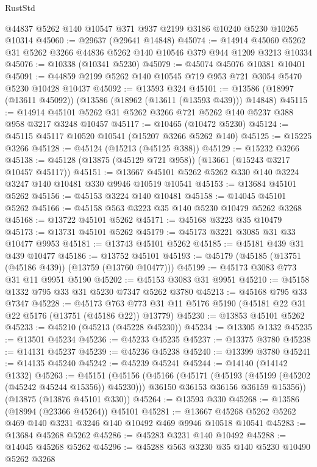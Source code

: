 \begin{lexlean}{RustStd}
\begin{coremodule}
    @44837
    @5262
    @140
    @10547
    @371
    @937
    @2199
    @3186
    @10240
    @5230
    @10265
    @10314
@45060 := @29637 (@29641 @14848)
@45074 := @14914 @45060 @5262 @31 @5262 @3266 @44836 @5262 @140 @10546 @379 @944 @1209 @3213 @10334
@45076 := @10338 (@10341 @5230)
@45079 := @45074 @45076 @10381 @10401
@45091 := @44859 @2199 @5262 @140 @10545 @719 @953 @721 @3054 @5470 @5230 @10428 @10437
@45092 := @13593 @324
@45101 := @13586 (@18997 (@13611 @45092)) (@13586 (@18962 (@13611 (@13593 @439))) @14848)
@45115 := @14914 @45101 @5262 @31 @5262 @3266 @721 @5262 @140 @5237 @388 @958 @3217 @3248 @10457
@45117 := @10465 (@10472 @5230)
@45124 := @45115 @45117 @10520 @10541 (@15207 @3266 @5262 @140)
@45125 := @15225 @3266
@45128 := @45124 (@15213 (@45125 @388))
@45129 := @15232 @3266
@45138 := @45128 (@13875 (@45129 @721 @958)) (@13661 (@15243 @3217 @10457 @45117))
@45151 := @13667 @45101 @5262 @5262 @330 @140 @3224 @3247 @140 @10481 @330 @9946 @10519 @10541
@45153 := @13684 @45101 @5262
@45156 := @45153 @3224 @140 @10481
@45158 := @14045 @45101 @5262
@45166 := @45158 @563 @3223 @35 @140 @5230 @10479 @5262 @3268
@45168 := @13722 @45101 @5262
@45171 := @45168 @3223 @35 @10479
@45173 := @13731 @45101 @5262
@45179 := @45173 @3221 @3085 @31 @33 @10477 @9953
@45181 := @13743 @45101 @5262
@45185 := @45181 @439 @31 @439 @10477
@45186 := @13752 @45101
@45193 := @45179 (@45185 (@13751 (@45186 @439)) (@13759 (@13760 @10477)))
@45199 := @45173 @3083 @773 @31 @11 @9951 @5190
@45202 := @45153 @3083 @31 @9951
@45210 := @45158 @1332 @795 @33 @31 @5230 @7347 @5262 @3780
@45213 := @45168 @795 @33 @7347
@45228 := @45173
    @763
    @773
    @31
    @11
    @5176
    @5190
    (@45181 @22 @31 @22 @5176 (@13751 (@45186 @22)) @13779)
@45230 := @13853 @45101 @5262
@45233 := @45210 (@45213 (@45228 @45230))
@45234 := @13305 @1332
@45235 := @13501 @45234
@45236 := @45233 @45235
@45237 := @13375 @3780
@45238 := @14131 @45237
@45239 := @45236 @45238
@45240 := @13399 @3780
@45241 := @14135 @45240
@45242 := @45239 @45241
@45244 := @14140 (@14142 @1332)
@45263 := @45151
    (@45156
      (@45166
        (@45171 (@45193 (@45199 (@45202 (@45242 @45244 @15356)) @45230)))
        @36150
        @36153
        @36156
        @36159
        @15356))
    (@13875 (@13876 @45101 @330))
@45264 := @13593 @330
@45268 := @13586 (@18994 (@23366 @45264)) @45101
@45281 := @13667 @45268 @5262 @5262 @469 @140 @3231 @3246 @140 @10492 @469 @9946 @10518 @10541
@45283 := @13684 @45268 @5262
@45286 := @45283 @3231 @140 @10492
@45288 := @14045 @45268 @5262
@45296 := @45288 @563 @3230 @35 @140 @5230 @10490 @5262 @3268

\end{coremodule}
\end{lexlean}
